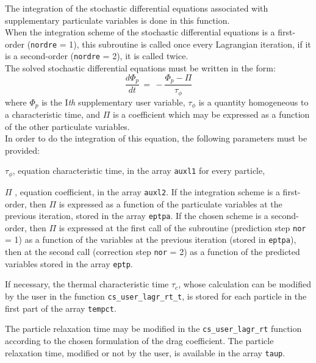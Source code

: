 {{{\noindent
The integration of the stochastic differential equations associated with
supplementary particulate variables is done in this function. \\
When the integration scheme of the stochastic differential equations is
a first-order (\texttt{nordre} = 1), this subroutine is called once every
Lagrangian iteration, if it is a second-order (\texttt{nordre} = 2), it is called
twice. \\

\noindent
The solved stochastic differential equations must be written in the
form:
\begin{displaymath}
\frac{d \Phi_p}{dt} \,=\, - \frac{\Phi_p - \Pi}{\tau_\phi}
\end{displaymath}
where $\Phi_p$ is the I\textit{th} supplementary user variable,
$\tau_\phi$ is a quantity homogeneous to a characteristic time, and $\Pi$ is
a coefficient which may be expressed as a function of the other
particulate variables. \\
In order to do the integration of this equation, the following
parameters must be provided:
\begin{list}{-}{}
\item $\tau_\phi$, equation characteristic time, in the array \texttt{auxl1} for
      every particle,
\item $\Pi$ , equation coefficient, in the array \texttt{auxl2}. If the
      integration scheme is a first-order, then $\Pi$ is expressed as a
      function of the particulate variables at the previous iteration,
      stored in the array \texttt{eptpa}. If the chosen scheme is a second-order,
      then $\Pi$ is expressed at the first call of the subroutine
      (prediction step \texttt{nor} = 1) as a function of the variables at the
      previous iteration (stored in \texttt{eptpa}), then at the second call
      (correction step \texttt{nor} = 2) as a function of the predicted variables
      stored in the array \texttt{eptp}.
\end{list}

\noindent
If necessary, the thermal characteristic time $\tau_c$, whose calculation can be modified by the user in the function
\texttt{cs\_user\_lagr\_rt\_t}, is stored for each particle in the first part of the array \texttt{tempct}.


\noindent
The particle relaxation time may be modified in the \texttt{cs\_user\_lagr\_rt} function according to the chosen formulation of the drag coefficient. The particle relaxation time, modified or not by the user, is available in the array \texttt{taup}.

}}}
